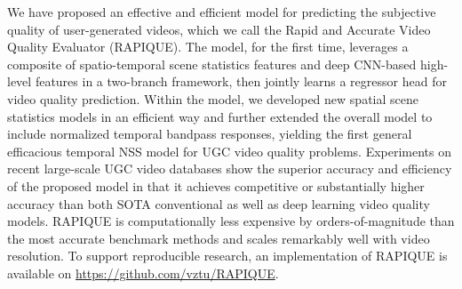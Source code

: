 \documentclass[transmag]{IEEEtran}
\begin{document}
We have proposed an effective and efficient model for predicting the subjective quality of user-generated videos, which we call the Rapid and Accurate Video Quality Evaluator (RAPIQUE). The model, for the first time, leverages a composite of spatio-temporal scene statistics features and deep CNN-based high-level features in a two-branch framework, then jointly learns a regressor head for video quality prediction. Within the model, we developed new spatial scene statistics models in an efficient way and further extended the overall model to include normalized temporal bandpass responses, yielding the first general efficacious temporal NSS model for UGC video quality problems. Experiments on recent large-scale UGC video databases show the superior accuracy and efficiency of the proposed model in that it achieves competitive or substantially higher accuracy than both SOTA conventional as well as deep learning video quality models. RAPIQUE is computationally less expensive by orders-of-magnitude than the most accurate benchmark methods and scales remarkably well with video resolution. To support reproducible research, an implementation of RAPIQUE is available on \url{https://github.com/vztu/RAPIQUE}. 













\end{document}
